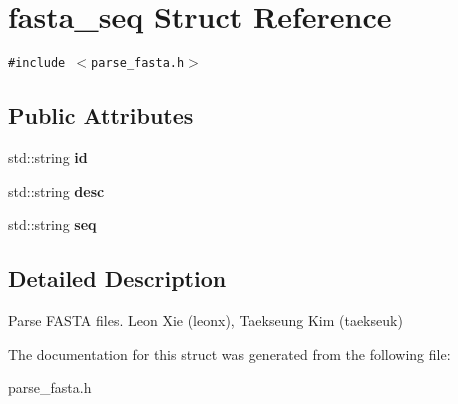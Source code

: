 \section{fasta\_\-seq Struct Reference}
\label{structfasta__seq}
{\tt \#include $<$parse\_\-fasta.h$>$}

\subsection*{Public Attributes}
\begin{CompactItemize}
\item 
std::string {\bf id}\label{structfasta__seq_o0}

\item 
std::string {\bf desc}\label{structfasta__seq_o1}

\item 
std::string {\bf seq}\label{structfasta__seq_o2}

\end{CompactItemize}


\subsection{Detailed Description}
Parse FASTA files. Leon Xie (leonx), Taekseung Kim (taekseuk) 



The documentation for this struct was generated from the following file:\begin{CompactItemize}
\item 
parse\_\-fasta.h\end{CompactItemize}
